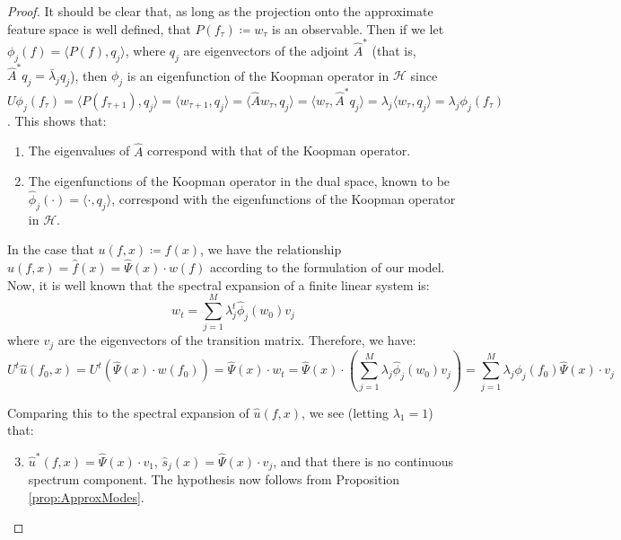 \documentclass[letterpaper,12pt,peerreviewca,draftcls]{IEEEtran}
\newcommand{\weight}{w}
\newcommand{\fspace}{\mathcal{H}}
\newcommand{\ncent}{M}
\newcommand{\fspaceEl}{f}
\newcommand{\fspaceApproxEl}{\widehat{\fspaceEl}}
\newcommand{\obsMatRow}{\widehat{\Psi}}
\newcommand{\dualop}{A}
\newcommand{\dualopApprox}{\widehat{\dualop}}
\newcommand{\tindex}{\tau}
\begin{document}
\begin{proof}
	It should be clear that, as long as the projection onto the approximate feature space is well defined, that $P(f_{\tindex}) \coloneqq \weight_{\tindex} $ is an observable. Then if we let $\phi_j(\fspaceEl) = \langle P(\fspaceEl), q_j \rangle$, where $q_j$ are eigenvectors of the adjoint $\dualopApprox^{\ast}$ (that is, $\dualopApprox^{\ast} q_j = \bar \lambda_j q_j$), then $\phi_j$ is an eigenfunction of the Koopman operator in $\fspace$ since $U \phi_j(f_{\tindex}) = \langle P(f_{\tindex+1}), q_j \rangle = \langle \weight_{\tindex+1}, q_j \rangle = \langle \dualopApprox \weight_{\tindex}, q_j \rangle =  \langle \weight_{\tindex}, \dualopApprox^{\ast} q_j \rangle =  \lambda_j \langle \weight_{\tindex}, q_j \rangle =  \lambda_j \phi_j(f_{\tindex})$. This shows that:
	\begin{enumerate}
		\item The eigenvalues of $\dualopApprox$ correspond with that of the Koopman operator.
		\item The eigenfunctions of the Koopman operator in the dual space, known to be $\hat\phi_j(\cdot) = \langle \cdot, q_j \rangle$, correspond with the eigenfunctions of the Koopman operator in $\fspace$.
	\end{enumerate}
	In the case that $u(\fspaceEl,x) \coloneqq \fspaceEl(x)$, we have the relationship $\hat u(\fspaceEl,x) = \fspaceApproxEl(x) = \obsMatRow(x) \cdot \weight(\fspaceEl)$ according to the formulation of our model. Now, it is well known that the spectral expansion of a finite linear system is:
	$$ \weight_t = \sum_{j=1}^{\ncent} \lambda_j^t \hat\phi_j(\weight_0) v_j$$
	where $v_j$ are the eigenvectors of the transition matrix. Therefore, we have:
	$$ U^t \hat u(\fspaceEl_0,x) = U^t \left( \obsMatRow(x) \cdot \weight(\fspaceEl_0) \right) = \obsMatRow(x) \cdot \weight_t = \obsMatRow(x) \cdot \left( \sum_{j=1}^{\ncent} \lambda_j \hat\phi_j(\weight_0)  v_j \right) = \sum_{j=1}^{\ncent} \lambda_j \phi_j(\fspaceEl_0) \obsMatRow(x) \cdot v_j$$
	
	Comparing this to the spectral expansion of $\hat u(\fspaceEl,x)$, we see (letting $\lambda_1=1$) that:
	\begin{enumerate}
		\setcounter{enumi}{2}
		\item $\hat u^{\ast}(\fspaceEl,x) = \obsMatRow(x) \cdot v_1$, $\hat s_j(x) = \obsMatRow(x) \cdot v_j$, and that there is no continuous spectrum component. The hypothesis now follows from Proposition \ref{prop:ApproxModes}.
	\end{enumerate}
	
\end{proof}
\end{document}
